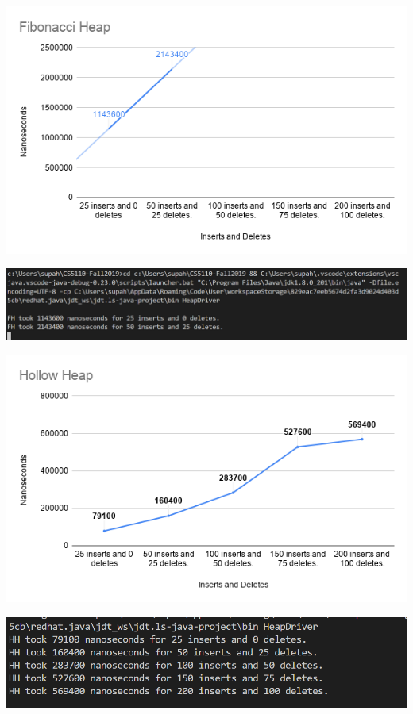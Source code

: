 \documentclass[letter,10pt]{article}
\begin{document}
\begin{center}
	\includegraphics[scale=.5]{FibonacciHeap.png}\\	
\end{center}
\begin{center}
	\includegraphics[scale=.35]{image(1).png}\\
\end{center}
\begin{center}
	\includegraphics[scale=.5]{HollowHeap.png}\\	
\end{center}
\begin{center}
	\includegraphics[scale=.45]{image.png}\\	
\end{center}
\end{document}
